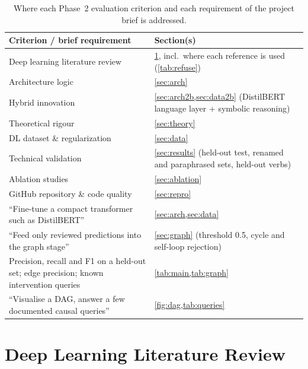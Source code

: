\documentclass[12pt,a4paper]{article}
\newcommand{\thead}[1]{\textbf{#1}}
\begin{document}
\begin{table}[!htbp]
\centering\small
\caption{Where each Phase~2 evaluation criterion and each requirement of the project brief is addressed.}
\label{tab:rubric}
\begin{tabularx}{\linewidth}{@{}>{\raggedright}p{5.4cm}X@{}}
\toprule
\thead{Criterion / brief requirement} & \thead{Section(s)} \\
\midrule
Deep learning literature review & \cref{sec:lit}, incl.\ where each reference is used (\cref{tab:refuse}) \\
\rowcolor{rowtint} Architecture logic & \cref{sec:arch} \\
Hybrid innovation & \cref{sec:arch2b,sec:data2b} (DistilBERT language layer + symbolic reasoning) \\
\rowcolor{rowtint} Theoretical rigour & \cref{sec:theory} \\
DL dataset \& regularization & \cref{sec:data} \\
\rowcolor{rowtint} Technical validation & \cref{sec:results} (held-out test, renamed and paraphrased sets, held-out verbs) \\
Ablation studies & \cref{sec:ablation} \\
\rowcolor{rowtint} GitHub repository \& code quality & \cref{sec:repro} \\
``Fine-tune a compact transformer such as DistilBERT'' & \cref{sec:arch,sec:data} \\
\rowcolor{rowtint} ``Feed only reviewed predictions into the graph stage'' & \cref{sec:graph} (threshold 0.5, cycle and self-loop rejection) \\
Precision, recall and F1 on a held-out set; edge precision; known intervention queries & \cref{tab:main,tab:graph} \\
\rowcolor{rowtint} ``Visualise a DAG, answer a few documented causal queries'' & \cref{fig:dag,tab:queries} \\
\bottomrule
\end{tabularx}
\end{table}

\section{Deep Learning Literature Review}\label{sec:lit}
\end{document}
